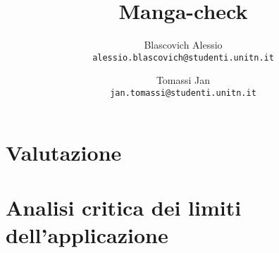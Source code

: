 \documentclass{report}
\title{Manga-check}
\author{Blascovich Alessio\\
	\texttt{alessio.blascovich@studenti.unitn.it}
	\and
	Tomassi Jan\\
	\texttt{jan.tomassi@studenti.unitn.it}
}
\begin{document}
\maketitle

\tableofcontents

\newpage













\chapter{Valutazione}

\chapter{Analisi critica dei limiti dell’applicazione}

\printbibliography[title=Bibliografia]
\end{document}
